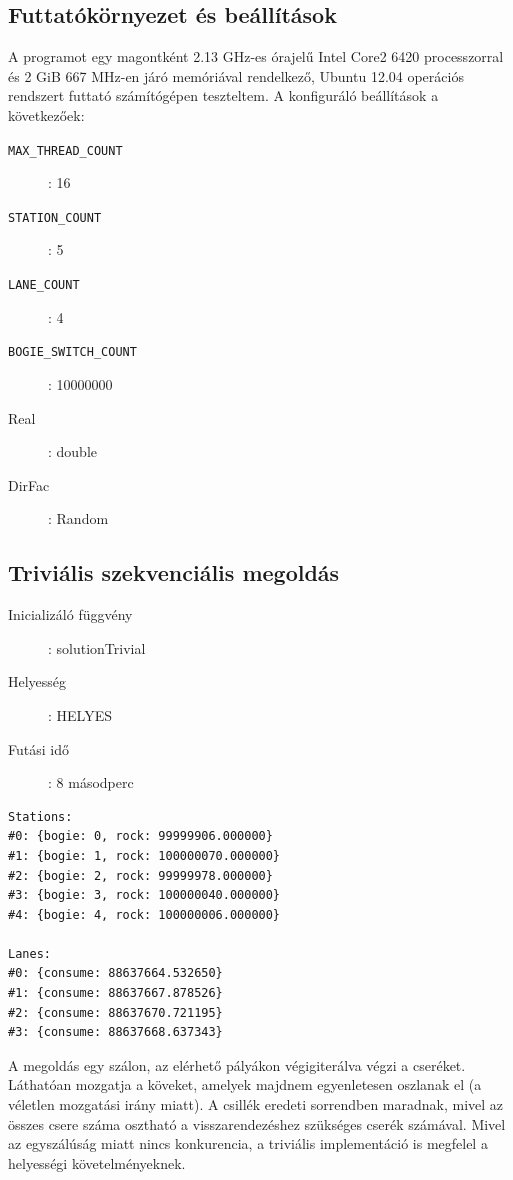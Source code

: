 \documentclass[a4paper,10pt]{article}
\begin{document}
	\subsection{Futtatókörnyezet és beállítások}
A programot	egy magontként 2.13 GHz-es órajelű Intel Core2 6420 processzorral és 2 GiB 667 MHz-en járó memóriával rendelkező, Ubuntu 12.04 operációs rendszert futtató számítógépen teszteltem. A konfiguráló beállítások a következőek:

\begin{description}
  \item[\texttt{MAX\_THREAD\_COUNT}]: 16
  \item[\texttt{STATION\_COUNT}]: 5
  \item[\texttt{LANE\_COUNT}]: 4
  \item[\texttt{BOGIE\_SWITCH\_COUNT}]: 10000000
  \item[Real]: double
  \item[DirFac]: Random
\end{description}



    \subsection{Triviális szekvenciális megoldás}
\begin{description}
  \item[Inicializáló függvény]: solutionTrivial
  \item[Helyesség]: HELYES
  \item[Futási idő]: 8 másodperc
\end{description}

\begin{lstlisting}
Stations:
#0: {bogie: 0, rock: 99999906.000000}
#1: {bogie: 1, rock: 100000070.000000}
#2: {bogie: 2, rock: 99999978.000000}
#3: {bogie: 3, rock: 100000040.000000}
#4: {bogie: 4, rock: 100000006.000000}

Lanes:
#0: {consume: 88637664.532650}
#1: {consume: 88637667.878526}
#2: {consume: 88637670.721195}
#3: {consume: 88637668.637343}
\end{lstlisting}

A megoldás egy szálon, az elérhető pályákon végigiterálva végzi a cseréket. Láthatóan mozgatja a köveket, amelyek majdnem egyenletesen oszlanak el (a véletlen mozgatási irány miatt). A csillék eredeti sorrendben maradnak, mivel az összes csere száma osztható a visszarendezéshez szükséges cserék számával. Mivel az egyszálúság miatt nincs konkurencia, a triviális implementáció is megfelel a helyességi követelményeknek.
\end{document}
